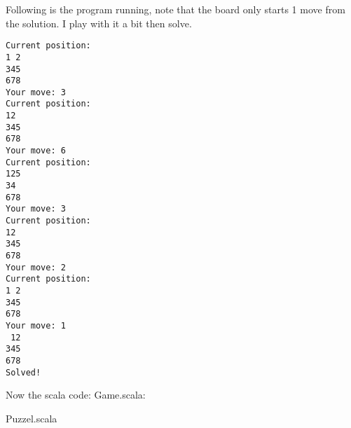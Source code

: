 \documentclass[12pt,fleqn,leqno,letterpaper]{article}
\begin{document}
Following is the program running, note that the board only starts 1 move from the solution. I play with it a bit then solve.
\begin{lstlisting}
Current position:
1 2
345
678
Your move: 3
Current position:
12 
345
678
Your move: 6 
Current position:
125
34 
678
Your move: 3
Current position:
12 
345
678
Your move: 2
Current position:
1 2
345
678
Your move: 1
 12
345
678
Solved!
\end{lstlisting}
Now the scala code:
Game.scala:

Puzzel.scala


\end{document}
